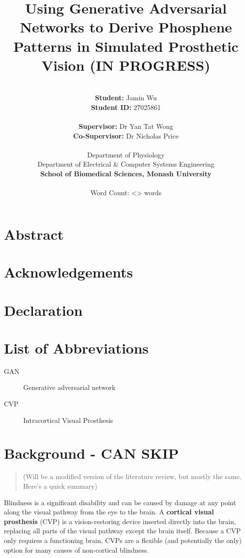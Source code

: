 \documentclass[11pt]{article}
\author{\\\textbf{Student:} Jamin Wu \\ \textbf{Student ID:} 27025861 \\ \\ \textbf{Supervisor:} Dr Yan Tat Wong \\ \textbf{Co-Supervisor:} Dr Nicholas Price \\ \\ Department of Physiology \\ Department of Electrical \& Computer Systems Engineering \\ \textbf{School of Biomedical Sciences, Monash University} \\ \\ Word Count: <> words}
\date{}
\title{\textbf{Using Generative Adversarial Networks to Derive Phosphene Patterns in Simulated Prosthetic Vision (IN PROGRESS)}}
\begin{document}
\maketitle
\clearpage

\section*{Abstract}

\clearpage

\section*{Acknowledgements}

\clearpage

\section*{Declaration}

\clearpage

\setcounter{tocdepth}{2}
\tableofcontents
\clearpage
\listoftables
\clearpage
\listoffigures
\clearpage

\section*{List of Abbreviations}

\begin{description}
\item[{GAN}] Generative adversarial network
\item[{CVP}] Intracortical Visual Prosthesis
\end{description}

\clearpage


\section{Background - CAN SKIP}
\label{sec:orgba2b151}

\begin{quote}
\color{red}
(Will be a modified version of the literature review, but mostly the same. Here's a quick summary)
\end{quote}

Blindness is a significant disability and can be caused by damage at any point along the visual pathway from the eye to the brain.
A \textbf{cortical visual prosthesis} (CVP) is a vision-restoring device inserted directly into the brain, replacing all parts of the visual pathway except the brain itself.
Because a CVP only requires a functioning brain, CVPs are a flexible (and potentially the only) option for many causes of non-cortical blindness.
\end{document}
